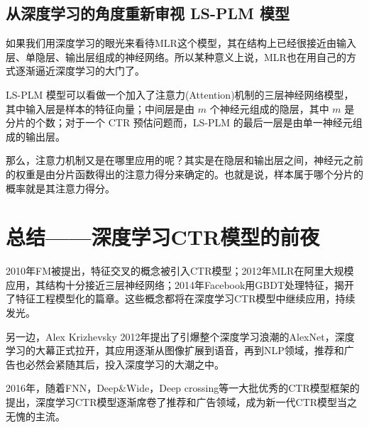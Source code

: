 \documentclass[12pt]{article}
\begin{document}
\subsection{从深度学习的角度重新审视 LS-PLM 模型}
如果我们用深度学习的眼光来看待MLR这个模型，其在结构上已经很接近由输入层、单隐层、输出层组成的神经网络。所以某种意义上说，MLR也在用自己的方式逐渐逼近深度学习的大门了。

LS-PLM 模型可以看做一个加入了注意力(Attention)机制的三层神经网络模型，其中输入层是样本的特征向量；中间层是由 $m$ 个神经元组成的隐层，其中 $m$ 是分片的个数；对于一个 CTR 预估问题而，LS-PLM 的最后一层是由单一神经元组成的输出层。

那么，注意力机制又是在哪里应用的呢？其实是在隐层和输出层之间，神经元之前的权重是由分片函数得出的注意力得分来确定的。也就是说，样本属于哪个分片的概率就是其注意力得分。

\section{总结——深度学习CTR模型的前夜}
2010年FM被提出，特征交叉的概念被引入CTR模型；2012年MLR在阿里大规模应用，其结构十分接近三层神经网络；2014年Facebook用GBDT处理特征，揭开了特征工程模型化的篇章。这些概念都将在深度学习CTR模型中继续应用，持续发光。

另一边，Alex Krizhevsky 2012年提出了引爆整个深度学习浪潮的AlexNet，深度学习的大幕正式拉开，其应用逐渐从图像扩展到语音，再到NLP领域，推荐和广告也必然会紧随其后，投入深度学习的大潮之中。

2016年，随着FNN，Deep\&Wide，Deep crossing等一大批优秀的CTR模型框架的提出，深度学习CTR模型逐渐席卷了推荐和广告领域，成为新一代CTR模型当之无愧的主流。
\end{document}
